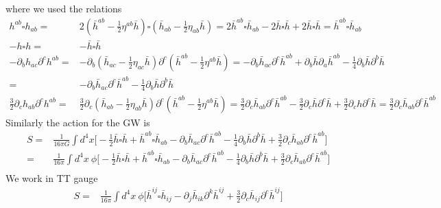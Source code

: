 \documentclass[
 jor,
 amsmath,amssymb,preprint,
]{revtex4-2}
\begin{document}
where we used the relations
\begin{align}
h^{ab} \square h_{ab} = & 2(\bar{h}^{ab}-\frac{1}{2}\eta^{ab}\bar{h})\square (\bar{h}_{ab} - \frac{1}{2}\eta_{ab}\bar{h}) = 2\bar{h}^{ab} \square \bar{h}_{ab} - 2 \bar{h}\square \bar{h} + 2\bar{h}\square \bar{h} = \bar{h}^{ab} \square \bar{h}_{ab} \\
- h \square h = & -\bar{h}\square \bar{h}\\
- \partial_b h_{ac}\partial^c h^{ab} = & -\partial_b(\bar{h}_{ac} - \frac{1}{2}\eta_{ac}\bar{h})\partial^c (\bar{h}^{ab}-\frac{1}{2}\eta^{ab}\bar{h}) = - \partial_b \bar{h}_{ac}\partial^c \bar{h}^{ab} + \partial_b \bar{h}\partial_a\bar{h}^{ab} - \frac{1}{4}\partial_b\bar{h} \partial^b\bar{h} \\
= & - \partial_b \bar{h}_{ac}\partial^c \bar{h}^{ab} - \frac{1}{4}\partial_b \bar{h} \partial^b \bar{h} \\
\frac{3}{2}\partial_c h_{ab}\partial^c h^{ab}  = & \frac{3}{2}\partial_c (\bar{h}_{ab} - \frac{1}{2}\eta_{ab}\bar{h}) \partial^c (\bar{h}^{ab}-\frac{1}{2}\eta^{ab}\bar{h}) = \frac{3}{2}\partial_c \bar{h}_{ab}\partial^c \bar{h}^{ab} -\frac{3}{2}\partial_c \bar{h} \partial^c \bar{h} + \frac{3}{2}\partial_ch\partial^c \bar{h} = \frac{3}{2}\partial_c \bar{h}_{ab}\partial^c \bar{h}^{ab}
\end{align}
Similarly the action for the GW is
\begin{equation}
\begin{aligned}
S = & \frac{1}{16\pi G} \int d^4x\bigg[  -\frac{1}{2} \bar{h}\square \bar{h} + \bar{h}^{ab}\square \bar{h}_{ab} - \partial_b \bar{h}_{ac}\partial^c \bar{h}^{ab} - \frac{1}{4}\partial_b\bar{h} \partial^b\bar{h} + \frac{3}{2}\partial_c \bar{h}_{ab}\partial^c \bar{h}^{ab} \bigg] \\
= & \frac{1}{16\pi } \int d^4x ~ \phi\bigg[  -\frac{1}{2} \bar{h}\square \bar{h} + \bar{h}^{ab}\square \bar{h}_{ab} - \partial_b \bar{h}_{ac}\partial^c \bar{h}^{ab} - \frac{1}{4}\partial_b\bar{h} \partial^b\bar{h} + \frac{3}{2}\partial_c \bar{h}_{ab}\partial^c \bar{h}^{ab} \bigg] \\
\end{aligned}
\end{equation}
We work in TT gauge
\begin{equation}
\begin{aligned}
S = & \frac{1}{16\pi } \int d^4x ~ \phi\bigg[ \bar{h}^{ij}\square \bar{h}_{ij} - \partial_j \bar{h}_{ik}\partial^k \bar{h}^{ij} + \frac{3}{2}\partial_c \bar{h}_{ij}\partial^c \bar{h}^{ij} \bigg] \\
\end{aligned}
\end{equation}
\end{document}
